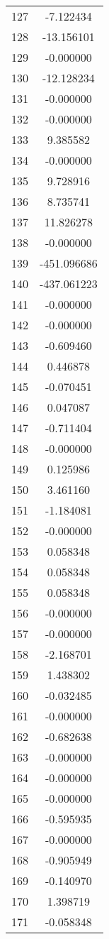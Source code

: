\documentclass[12pt]{article}
\begin{document}
\begin{longtable}{@{}cc@{}}
127 & -7.122434 \\
128 & -13.156101 \\
129 & -0.000000 \\
130 & -12.128234 \\
131 & -0.000000 \\
132 & -0.000000 \\
133 & 9.385582 \\
134 & -0.000000 \\
135 & 9.728916 \\
136 & 8.735741 \\
137 & 11.826278 \\
138 & -0.000000 \\
139 & -451.096686 \\
140 & -437.061223 \\
141 & -0.000000 \\
142 & -0.000000 \\
143 & -0.609460 \\
144 & 0.446878 \\
145 & -0.070451 \\
146 & 0.047087 \\
147 & -0.711404 \\
148 & -0.000000 \\
149 & 0.125986 \\
150 & 3.461160 \\
151 & -1.184081 \\
152 & -0.000000 \\
153 & 0.058348 \\
154 & 0.058348 \\
155 & 0.058348 \\
156 & -0.000000 \\
157 & -0.000000 \\
158 & -2.168701 \\
159 & 1.438302 \\
160 & -0.032485 \\
161 & -0.000000 \\
162 & -0.682638 \\
163 & -0.000000 \\
164 & -0.000000 \\
165 & -0.000000 \\
166 & -0.595935 \\
167 & -0.000000 \\
168 & -0.905949 \\
169 & -0.140970 \\
170 & 1.398719 \\
171 & -0.058348 \\

\end{longtable}
\end{document}
